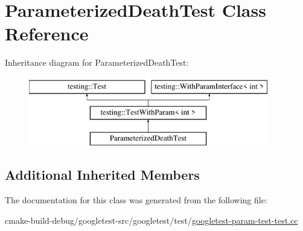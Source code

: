 \hypertarget{classParameterizedDeathTest}{}\section{Parameterized\+Death\+Test Class Reference}
\label{classParameterizedDeathTest}
Inheritance diagram for Parameterized\+Death\+Test\+:\begin{figure}[H]
\begin{center}
\leavevmode
\includegraphics[height=3.000000cm]{classParameterizedDeathTest}
\end{center}
\end{figure}
\subsection*{Additional Inherited Members}


The documentation for this class was generated from the following file\+:\begin{DoxyCompactItemize}
\item 
cmake-\/build-\/debug/googletest-\/src/googletest/test/\mbox{\hyperlink{googletest-param-test-test_8cc}{googletest-\/param-\/test-\/test.\+cc}}\end{DoxyCompactItemize}
